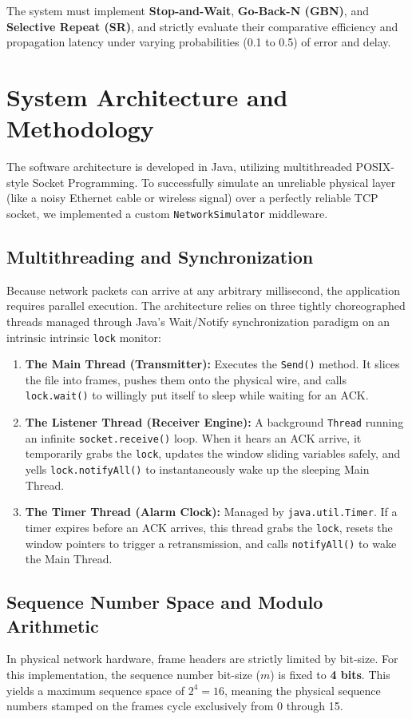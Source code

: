 \documentclass[12pt]{article}
\begin{document}
The system must implement \textbf{Stop-and-Wait}, \textbf{Go-Back-N (GBN)}, and \textbf{Selective Repeat (SR)}, and strictly evaluate their comparative efficiency and propagation latency under varying probabilities (0.1 to 0.5) of error and delay.

\section{System Architecture and Methodology}
The software architecture is developed in Java, utilizing multithreaded POSIX-style Socket Programming. To successfully simulate an unreliable physical layer (like a noisy Ethernet cable or wireless signal) over a perfectly reliable TCP socket, we implemented a custom \texttt{NetworkSimulator} middleware.

\subsection{Multithreading and Synchronization}
Because network packets can arrive at any arbitrary millisecond, the application requires parallel execution. The architecture relies on three tightly choreographed threads managed through Java's Wait/Notify synchronization paradigm on an intrinsic intrinsic \texttt{lock} monitor:
\begin{enumerate}
    \item \textbf{The Main Thread (Transmitter):} Executes the \texttt{Send()} method. It slices the file into frames, pushes them onto the physical wire, and calls \texttt{lock.wait()} to willingly put itself to sleep while waiting for an ACK.
    \item \textbf{The Listener Thread (Receiver Engine):} A background \texttt{Thread} running an infinite \texttt{socket.receive()} loop. When it hears an ACK arrive, it temporarily grabs the \texttt{lock}, updates the window sliding variables safely, and yells \texttt{lock.notifyAll()} to instantaneously wake up the sleeping Main Thread.
    \item \textbf{The Timer Thread (Alarm Clock):} Managed by \texttt{java.util.Timer}. If a timer expires before an ACK arrives, this thread grabs the \texttt{lock}, resets the window pointers to trigger a retransmission, and calls \texttt{notifyAll()} to wake the Main Thread.
\end{enumerate}

\subsection{Sequence Number Space and Modulo Arithmetic}
In physical network hardware, frame headers are strictly limited by bit-size. For this implementation, the sequence number bit-size ($m$) is fixed to \textbf{4 bits}. This yields a maximum sequence space of $2^4 = 16$, meaning the physical sequence numbers stamped on the frames cycle exclusively from 0 through 15. 
\end{document}
